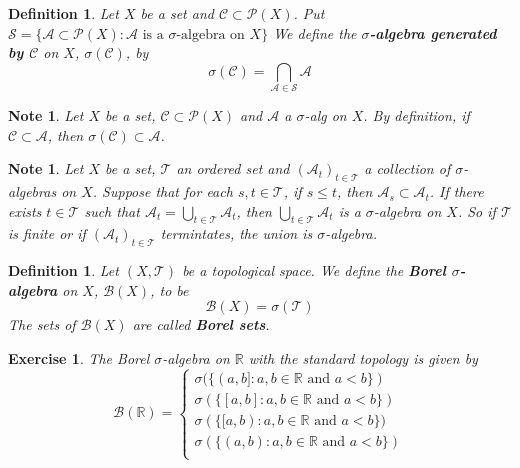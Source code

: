 \documentclass[12pt]{amsart}
\newtheorem{defn}[thm]{Definition}
\newtheorem{note}[thm]{Note}
\newtheorem{ex}[thm]{Exercise}
\newcommand{\sig}{\sigma}
\newcommand{\R}{\mathbb{R}}
\newcommand{\MA}{\mathcal{A}}
\newcommand{\MC}{\mathcal{C}}
\newcommand{\MB}{\mathcal{B}}
\newcommand{\MS}{\mathcal{S}}
\newcommand{\MP}{\mathcal{P}}
\newcommand{\MT}{\mathcal{T}}
\begin{document}
\begin{defn}
Let $X$ be a set and $\MC \subset \MP(X)$. Put $\MS = \{\MA \subset \MP(X): \MA \text{ is a }\sig\text{-algebra on }X \}$ We define the \textbf{$\sig$-algebra generated by $\MC$} on $X$, $\sig(\MC)$, by $$\sig(\MC) = \bigcap_{\MA \in \MS} \MA $$
\end{defn}

\begin{note}
Let $X$ be a set, $\MC \subset \MP(X)$ and $\MA$ a $\sig$-alg on $X$. By definition, if $\MC \subset \MA$, then $\sig(\MC) \subset \MA$.
\end{note}

\begin{note}
Let $X$ be a set, $\MT$ an ordered set and $(\MA_t)_{t\in \MT}$ a collection of $\sig$-algebras on $X$. Suppose that for each $s,t \in \MT$, if $s \leq t$, then $\MA_s \subset \MA_t$. If there exists $t \in \MT$ such that $\MA_t = \bigcup\limits_{t \in \MT}\MA_t$, then $\bigcup\limits_{t \in \MT}\MA_t$ is a $\sig$-algebra on $X$. So if $\MT$ is finite or if $(\MA_t)_{t \in \MT}$ termintates, the union is $\sig$-algebra.
\end{note}

\begin{defn}
Let $(X,\MT)$ be a topological space. We define the \textbf{Borel $\sig$-algebra} on $X$, $\MB(X)$, to be  $$\MB(X) = \sig(\MT)$$ The sets of $\MB(X)$ are called \textbf{Borel sets}.
\end{defn}

\begin{ex}
The Borel $\sigma$-algebra on $\R$ with the standard topology is given by 
\[
\MB(\R) =
\begin{cases}
\sig(\{(a,b]:a,b \in \R \text{ and } a<b\}) \\
\sig(\{[a,b]:a,b \in \R \text{ and } a<b\}) \\
\sig(\{[a,b):a,b \in \R \text{ and } a<b\}) \\
\sig(\{(a,b):a,b \in \R \text{ and } a<b\}) \\
\end{cases}
\]
\end{ex}
\end{document}
